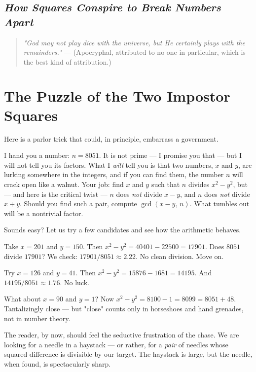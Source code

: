 \documentclass[11pt,twoside,openright]{book}
\theoremstyle{definition}
\theoremstyle{remark}
\begin{document}
\subsection{\textit{How Squares Conspire to Break Numbers Apart}}


\begin{quote}
\textit{"God may not play dice with the universe, but He certainly plays with the remainders."}
--- (Apocryphal, attributed to no one in particular, which is the best kind of attribution.)
\end{quote}

\section{The Puzzle of the Two Impostor Squares}

Here is a parlor trick that could, in principle, embarrass a government.

I hand you a number: $n = 8051$. It is not prime --- I promise you that --- but I will not tell you its factors. What I \textit{will} tell you is that two numbers, $x$ and $y$, are lurking somewhere in the integers, and if you can find them, the number $n$ will crack open like a walnut. Your job: find $x$ and $y$ such that $n$ divides $x^2 - y^2$, but --- and here is the critical twist --- $n$ does \textit{not} divide $x - y$, and $n$ does \textit{not} divide $x + y$. Should you find such a pair, compute $\gcd(x - y, \, n)$. What tumbles out will be a nontrivial factor.

Sounds easy? Let us try a few candidates and see how the arithmetic behaves.

Take $x = 201$ and $y = 150$. Then $x^2 - y^2 = 40401 - 22500 = 17901$. Does $8051$ divide $17901$? We check: $17901 / 8051 \approx 2.22$. No clean division. Move on.

Try $x = 126$ and $y = 41$. Then $x^2 - y^2 = 15876 - 1681 = 14195$. And $14195 / 8051 \approx 1.76$. No luck.

What about $x = 90$ and $y = 1$? Now $x^2 - y^2 = 8100 - 1 = 8099 = 8051 + 48$. Tantalizingly close --- but "close" counts only in horseshoes and hand grenades, not in number theory.

The reader, by now, should feel the seductive frustration of the chase. We are looking for a needle in a haystack --- or rather, for a \textit{pair} of needles whose squared difference is divisible by our target. The haystack is large, but the needle, when found, is spectacularly sharp.
\end{document}
